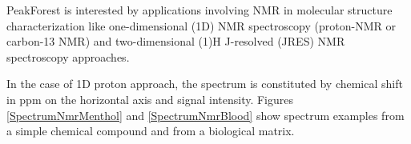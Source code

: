 PeakForest is interested by applications involving NMR in molecular structure characterization like one-dimensional (1D) NMR spectroscopy (proton-NMR or carbon-13 NMR) and two-dimensional (1)H J-resolved (JRES) NMR spectroscopy approaches. 

In the case of 1D proton approach, the spectrum is constituted by chemical shift in ppm on the horizontal axis and signal intensity. Figures \ref{SpectrumNmrMenthol} and \ref{SpectrumNmrBlood} show spectrum examples from a simple chemical compound and from a biological matrix.

\begin{figure}[htbp]
	\centering
	\quad
\end{figure}

